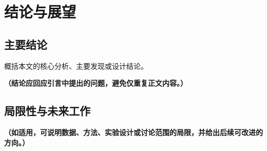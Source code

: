 \section{结论与展望}

\subsection{主要结论}
概括本文的核心分析、主要发现或设计结论。

\textbf{\color{red}（结论应回应引言中提出的问题，避免仅重复正文内容。）}

\subsection{局限性与未来工作}
\textbf{\color{red}（如适用，可说明数据、方法、实验设计或讨论范围的局限，并给出后续可改进的方向。）}
